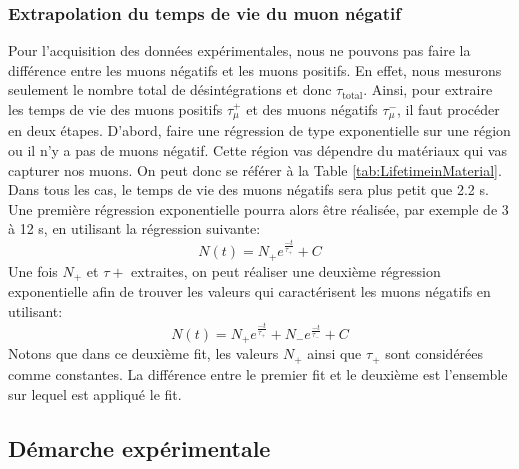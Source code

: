 \documentclass[12pt]{article}
\begin{document}
\newpage

\subsubsection{Extrapolation du temps de vie du muon négatif}

Pour l'acquisition des données expérimentales, nous ne pouvons pas faire la différence entre les muons négatifs et les muons positifs. En effet, nous mesurons seulement le nombre total de désintégrations et donc $\tau_{\text{total}}$. Ainsi, pour extraire les temps de vie des muons positifs $\tau^{+}_{\mu}$ et des muons négatifs $\tau^{-}_{\mu}$, il faut procéder en deux étapes. D'abord, faire une régression de type exponentielle sur une région ou il n'y a pas de muons négatif. Cette région vas dépendre du matériaux qui vas capturer nos muons. On peut donc se référer à la Table \ref{tab:LifetimeinMaterial}. Dans tous les cas, le temps de vie des muons négatifs sera plus petit que 2.2 \SIUnitSymbolMicro s. Une première régression exponentielle pourra alors être réalisée, par exemple de 3 à 12 \SIUnitSymbolMicro s, en utilisant la régression suivante:
\[ N(t) = N_{+}e^{\frac{-t}{\tau_{+}}}+C \]
Une fois $N_{+}$ et $\tau+$ extraites, on peut réaliser une deuxième régression exponentielle afin de trouver les valeurs qui caractérisent les muons négatifs en utilisant:
\[ N(t) = N_{+}e^{\frac{-t}{\tau_{+}}}+N_{-}e^{\frac{-t}{\tau_{-}}}+C \]
Notons que dans ce deuxième fit, les valeurs $N_{+}$ ainsi que $\tau_{+}$ sont considérées comme constantes. La différence entre le premier fit et le deuxième est l'ensemble sur lequel est appliqué le fit. 



\subsection{Démarche expérimentale}
\end{document}
